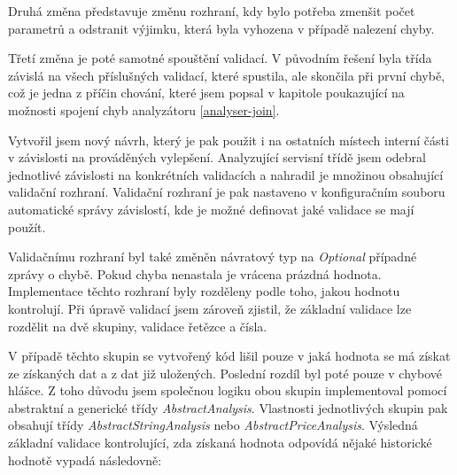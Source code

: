 \documentclass[thesis=B,czech]{FITthesis}[2012/06/26]
\begin{document}
\par
Druhá změna představuje změnu rozhraní, kdy bylo potřeba
zmenšit počet parametrů a odstranit výjimku, která byla vyhozena v případě nalezení chyby. 
\par
Třetí změna je poté samotné spouštění 
validací. V původním řešení byla třída závislá na všech příslušných validací, které spustila, ale skončila při první chybě, což je jedna 
z příčin chování, které jsem popsal v kapitole poukazující na možnosti spojení chyb analyzátoru \autoref{analyser-join}.
\par
Vytvořil jsem nový návrh, který je pak použit i na ostatních místech interní části v závislosti na
prováděných vylepšení. Analyzující servisní třídě jsem odebral jednotlivé závislosti na konkrétních validacích a nahradil je množinou 
obsahující validační rozhraní. Validační rozhraní je pak nastaveno v konfiguračním souboru automatické správy závislostí, kde je možné
definovat jaké validace se mají použít.
\par
Validačnímu rozhraní byl také změněn návratový typ na \textit{Optional} případné zprávy o chybě. Pokud chyba nenastala je vrácena
prázdná hodnota. Implementace těchto rozhraní byly rozděleny podle toho, jakou hodnotu kontrolují.
Při úpravě validací jsem zároveň zjistil, že základní validace lze rozdělit na dvě skupiny, validace řetězce a čísla.
\par
V případě těchto skupin se vytvořený kód lišil pouze v jaká hodnota se má získat ze získaných dat a z dat již uložených.
Poslední rozdíl byl poté pouze v chybové hlášce. Z toho důvodu jsem společnou logiku obou skupin implementoval
pomocí abstraktní a generické třídy \textit{AbstractAnalysis}. Vlastnosti jednotlivých skupin pak obsahují třídy \textit{AbstractStringAnalysis} 
nebo \textit{AbstractPriceAnalysis}. Výsledná základní validace kontrolující, zda získaná hodnota odpovídá nějaké historické hodnotě
vypadá následovně:
\end{document}
